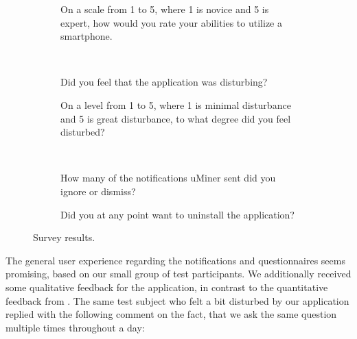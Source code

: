\begin{figure}[!htbp]
    \begin{subfigure}[!t]{.45\textwidth}
      \centering
        
        \caption{On a scale from 1 to 5, where 1 is novice and 5 is expert, how would you rate your abilities to utilize a smartphone.}
      \label{fig:smartphone_ability}
    \end{subfigure}
    ~
    \begin{subfigure}[!htbp]{.45\textwidth}
      \centering
        
      \caption{Did you feel that the application was disturbing?}
      \label{fig:general_disturbance}
    \end{subfigure}
    \vspace{1em}
    \begin{subfigure}[!htbp]{.45\textwidth}
      \centering
        
      \caption{On a level from 1 to 5, where 1 is minimal disturbance and 5 is great disturbance, to what degree did you feel disturbed?}
      \label{fig:disturbance_level}
    \end{subfigure}
    ~
    \begin{subfigure}[!htbp]{.45\textwidth}
      \centering
        
      \caption{How many of the notifications uMiner sent did you ignore or dismiss?}
      \label{fig:ingore_notifications}
    \end{subfigure}
    \vspace{1em}
    \begin{subfigure}[!htbp]{\textwidth}
      \centering
        
      \caption{Did you at any point want to uninstall the application?}
      \label{fig:want_to_uninstall}
    \end{subfigure}
    \caption{Survey results.}
    \label{fig:survey_results}
    \end{figure}
\FloatBarrier

The general user experience regarding the notifications and questionnaires seems promising, based on our small group of test participants. We additionally received some qualitative feedback for the application, in contrast to the quantitative feedback from . The same test subject who felt a bit disturbed by our application replied with the following comment on the fact, that we ask the same question multiple times throughout a day:

